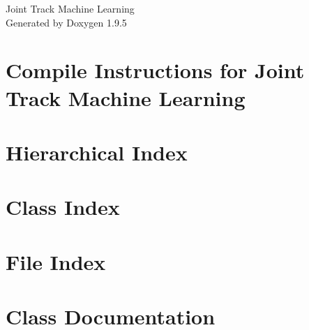\documentclass[twoside]{book}
\newcommand{\+}{\discretionary{\mbox{\scriptsize$\hookleftarrow$}}{}{}}
\newcommand{\clearemptydoublepage}{%
    \newpage{\pagestyle{empty}\cleardoublepage}%
  }
\begin{document}
  \raggedbottom
    \hypersetup{pageanchor=false,
                bookmarksnumbered=true,
                pdfencoding=unicode
               }
  \begin{titlepage}
  \vspace*{7cm}
  \begin{center}%
  {\Large Joint Track Machine Learning}\\
  \vspace*{1cm}
  {\large Generated by Doxygen 1.9.5}\\
  \end{center}
  \end{titlepage}
  \clearemptydoublepage
  \tableofcontents
  \clearemptydoublepage
  \hypersetup{pageanchor=true}
\chapter{Compile Instructions for Joint Track Machine Learning}
\label{md_compile_instructions}

\chapter{Hierarchical Index}

\chapter{Class Index}

\chapter{File Index}

\chapter{Class Documentation}





































\end{document}
